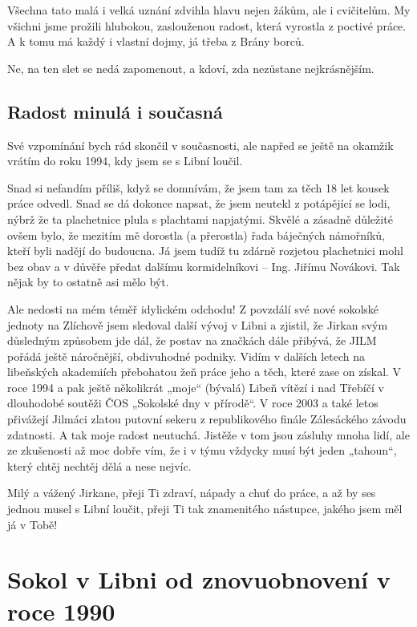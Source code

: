 Všechna tato malá i velká uznání zdvihla hlavu nejen žákům, ale i
cvičitelům. My všichni jsme prožili hlubokou, zaslouženou radost, která
vyrostla z poctivé práce. A k tomu má každý i vlastní dojmy, já třeba z
Brány borců.

Ne, na ten slet se nedá zapomenout, a kdoví, zda nezůstane
nejkrásnějším.

\subsection{Radost minulá i
současná}\label{radost-minuluxe1-i-souux10dasnuxe1}

Své vzpomínání bych rád skončil v současnosti, ale napřed se ještě na
okamžik vrátím do roku 1994, kdy jsem se s Libní loučil.

Snad si nefandím příliš, když se domnívám, že jsem tam za těch 18 let
kousek práce odvedl. Snad se dá dokonce napsat, že jsem neutekl z
potápějící se lodi, nýbrž že ta plachetnice plula s plachtami napjatými.
Skvělé a zásadně důležité ovšem bylo, že mezitím mě dorostla (a
přerostla) řada báječných námořníků, kteří byli nadějí do budoucna. Já
jsem tudíž tu zdárně rozjetou plachetnici mohl bez obav a v důvěře
předat dalšímu kormidelníkovi -- Ing. Jiřímu Novákovi. Tak nějak by to
ostatně asi mělo být.

Ale nedosti na mém téměř idylickém odchodu! Z povzdálí své nové sokolské
jednoty na Zlíchově jsem sledoval další vývoj v Libni a zjistil, že
Jirkan svým důsledným způsobem jde dál, že postav na značkách dále
přibývá, že JILM pořádá ještě náročnější, obdivuhodné podniky. Vidím v
dalších letech na libeňských akademiích přebohatou žeň práce jeho a
těch, které zase on získal. V roce 1994 a pak ještě několikrát „moje``
(bývalá) Libeň vítězí i nad Třebíčí v dlouhodobé soutěži ČOS „Sokolské
dny v přírodě``. V roce 2003 a také letos přivážejí Jilmáci zlatou
putovní sekeru z republikového finále Zálesáckého závodu zdatnosti. A
tak moje radost neutuchá. Jistěže v tom jsou zásluhy mnoha lidí, ale ze
zkušenosti až moc dobře vím, že i v týmu vždycky musí být jeden
„tahoun``, který chtěj nechtěj dělá a nese nejvíc.

Milý a vážený Jirkane, přeji Ti zdraví, nápady a chuť do práce, a až by
ses jednou musel s Libní loučit, přeji Ti tak znamenitého nástupce,
jakého jsem měl já v Tobě!

\section{\texorpdfstring{Sokol v Libni od znovuobnovení v roce 1990
}{Sokol v Libni od znovuobnovení v roce 1990 }}\label{sokol-v-libni-od-znovuobnovenuxed-v-roce-1990}

